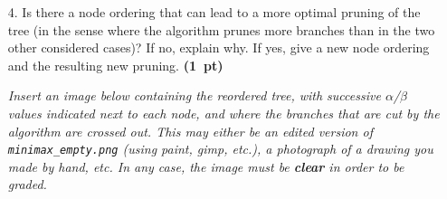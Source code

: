 \documentclass[11pt,a4paper]{report}
\begin{document}
\clearpage
\begin{enumerate}
\item[4.] Is there a node ordering that can lead to a more optimal pruning of the tree
(in the sense where the algorithm prunes more branches than in the two other
considered cases)? If no, explain why. If yes, give a new node ordering and the
resulting new pruning.  \textbf{(1~pt)}
      
      \textit{Insert an image below containing the reordered tree, with successive $\alpha$/$\beta$ values indicated next to each node, and where the branches that are cut by the algorithm are crossed out. This may either be an edited version of \texttt{minimax\_empty.png} (using paint, gimp, etc.), a photograph of a drawing you made by hand, etc. In any case, the image must be \textbf{clear} in order to be graded.}
\end{enumerate}
\end{document}
